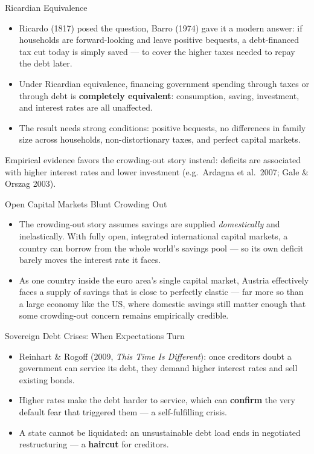 \documentclass[11pt,aspectratio=169]{beamer}
\begin{document}
\begin{frame}{Ricardian Equivalence}
  \small
  \begin{itemize}
    \item Ricardo (1817) posed the question, Barro (1974) gave it a modern answer: if households are forward-looking and leave positive bequests, a debt-financed tax cut today is simply saved --- to cover the higher taxes needed to repay the debt later.
    \item Under Ricardian equivalence, financing government spending through taxes or through debt is \textbf{completely equivalent}: consumption, saving, investment, and interest rates are all unaffected.
    \item The result needs strong conditions: positive bequests, no differences in family size across households, non-distortionary taxes, and perfect capital markets.
  \end{itemize}
  \vspace{0.3em}
  Empirical evidence favors the crowding-out story instead: deficits are associated with higher interest rates and lower investment (e.g.\ Ardagna et al.\ 2007; Gale \& Orszag 2003).
\end{frame}

\begin{frame}{Open Capital Markets Blunt Crowding Out}

  \begin{itemize}
    \item The crowding-out story assumes savings are supplied \emph{domestically} and inelastically. With fully open, integrated international capital markets, a country can borrow from the whole world's savings pool --- so its own deficit barely moves the interest rate it faces.
 	\item As one country inside the euro area's single capital market, Austria effectively faces a supply of savings that is close to perfectly elastic --- far more so than a large economy like the US, where domestic savings still matter enough that some crowding-out concern remains empirically credible.
 \end{itemize}
\end{frame}

\begin{frame}{Sovereign Debt Crises: When Expectations Turn}
  \small
  \begin{itemize}
    \item Reinhart \& Rogoff (2009, \emph{This Time Is Different}): once creditors doubt a government can service its debt, they demand higher interest rates and sell existing bonds.
    \item Higher rates make the debt harder to service, which can \textbf{confirm} the very default fear that triggered them --- a self-fulfilling crisis.
    \item A state cannot be liquidated: an unsustainable debt load ends in negotiated restructuring --- a \textbf{haircut} for creditors.
  \end{itemize}
\end{frame}
\end{document}
